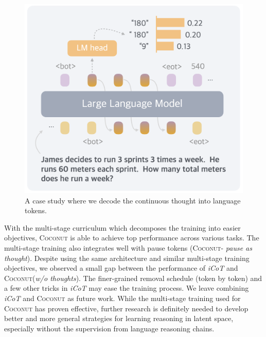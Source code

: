 \documentclass[]{fairmeta}
\newcommand{\ours}{\textsc{Coconut}\xspace}
\begin{document}
\begin{figure}
    \centering
    \vspace{-10pt}
    \includegraphics[width=\linewidth]{figures/figure_4_meta.png}
    \caption{A case study where we decode the continuous thought into language tokens.}
    \vspace{-10pt}
    \label{fig:case}
\end{figure}

With the multi-stage curriculum which decomposes the training into easier objectives, \ours is able to achieve top performance across various tasks. The multi-stage training also integrates well with pause tokens (\ours - \textit{pause as thought}). Despite using the same architecture and similar multi-stage training objectives, we observed a small gap between the performance of \textit{iCoT} and \ours (\textit{w/o thoughts}). The finer-grained removal schedule (token by token) and a few other tricks in \textit{iCoT} may ease the training process. We leave combining \textit{iCoT} and \ours as future work. While the multi-stage training used for \ours has proven effective, further research is definitely needed to develop better and more general strategies for learning reasoning in latent space, especially without the supervision from language reasoning chains.
\end{document}
